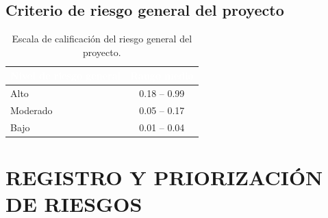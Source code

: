 \documentclass[11pt,a4paper]{article}
\begin{document}
\newpage
\subsection{Criterio de riesgo general del proyecto}

\begin{table}[H]
\centering
\renewcommand{\arraystretch}{1.3}
\caption{Escala de calificación del riesgo general del proyecto.}
\label{tab:riesgo_general}
\begin{tabularx}{0.7\textwidth}{|X|c|}
\hline
\rowcolor{ArthroNavy}
\textcolor{white}{\textbf{Nivel de riesgo general}} & \textcolor{white}{\textbf{Rango medio}} \\
\hline
\cellcolor{red!40}Alto & 0.18 -- 0.99 \\
\hline
\cellcolor{yellow!55}Moderado & 0.05 -- 0.17 \\
\hline
\cellcolor{green!35}Bajo & 0.01 -- 0.04 \\
\hline
\end{tabularx}
\end{table}

\newpage

\section{REGISTRO Y PRIORIZACIÓN DE RIESGOS}
\end{document}
